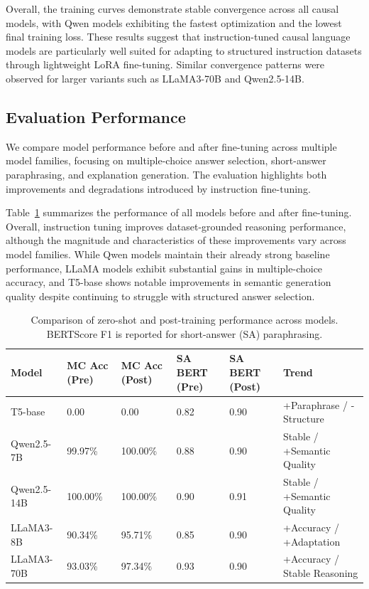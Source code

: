\documentclass[a4paper,fleqn]{cas-sc}
\begin{document}
Overall, the training curves demonstrate stable convergence across all causal models, with Qwen models exhibiting the fastest optimization and the lowest final training loss. These results suggest that instruction-tuned causal language models are particularly well suited for adapting to structured instruction datasets through lightweight LoRA fine-tuning. Similar convergence patterns were observed for larger variants such as LLaMA3-70B and Qwen2.5-14B.

\subsection{Evaluation Performance}

We compare model performance before and after fine-tuning across multiple model families, focusing on multiple-choice answer selection, short-answer paraphrasing, and explanation generation. The evaluation highlights both improvements and degradations introduced by instruction fine-tuning.

Table~\ref{tab:eval_comparison} summarizes the performance of all models before and after fine-tuning. Overall, instruction tuning improves dataset-grounded reasoning performance, although the magnitude and characteristics of these improvements vary across model families. While Qwen models maintain their already strong baseline performance, LLaMA models exhibit substantial gains in multiple-choice accuracy, and T5-base shows notable improvements in semantic generation quality despite continuing to struggle with structured answer selection.

\begin{table}[H]
\centering
\renewcommand{\arraystretch}{1.7}
\caption{Comparison of zero-shot and post-training performance across models. \\BERTScore F1 is reported for short-answer (SA) paraphrasing.}
\label{tab:eval_comparison}
\begin{tabular}{|p{1.2cm}|p{1cm}|p{1cm}|p{1cm}|p{1cm}|p{1.5cm}|}
\hline
\textbf{Model} & \textbf{MC Acc (Pre)} & \textbf{MC Acc (Post)} & \textbf{SA BERT (Pre)} & \textbf{SA BERT (Post)} & \textbf{Trend} \\
\hline
T5-base & 0.00 & 0.00 & 0.82 & 0.90 & +Paraphrase / -Structure \\
\hline
Qwen2.5-7B & 99.97\% & 100.00\% & 0.88 & 0.90 & Stable / +Semantic Quality \\
\hline
Qwen2.5-14B & 100.00\% & 100.00\% & 0.90 & 0.91 & Stable / +Semantic Quality \\
\hline
LLaMA3-8B & 90.34\% & 95.71\% & 0.85 & 0.90 & +Accuracy / +Adaptation \\
\hline
LLaMA3-70B & 93.03\% & 97.34\% & 0.93 & 0.90 & +Accuracy / Stable Reasoning \\
\hline
\end{tabular}
\end{table}
\end{document}

